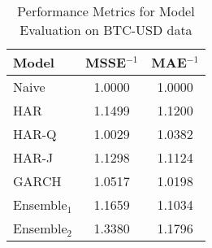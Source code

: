 

\begin{table}[ht]    
\begin{center}
    \begin{minipage}[t]{0.3\textwidth}
        \small %
        \caption{Performance Metrics for Model Evaluation on BTC-USD data}
        \label{tab:model_metrics_A}
        \begin{tabular}{l S[table-format=1.4] S[table-format=1.4]}
            \toprule
             \textbf{Model} & \textbf{MSSE$^{-1}$} & \textbf{MAE$^{-1}$} \\
            \midrule
            Naive               & 1.0000   & 1.0000 \\
            HAR                 & 1.1499   & 1.1200 \\
            HAR-Q               & 1.0029   & 1.0382 \\
            HAR-J               & 1.1298   & 1.1124 \\
            GARCH               & 1.0517   & 1.0198 \\
            Ensemble$_1$           & 1.1659   & 1.1034 \\
            Ensemble$_2$       & 1.3380   & 1.1796 \\
            \bottomrule
        \end{tabular}
    \end{minipage}
    \hspace{50pt} %
    \begin{minipage}[t]{0.3\textwidth}

\end{minipage}
\end{center}
\end{table}
